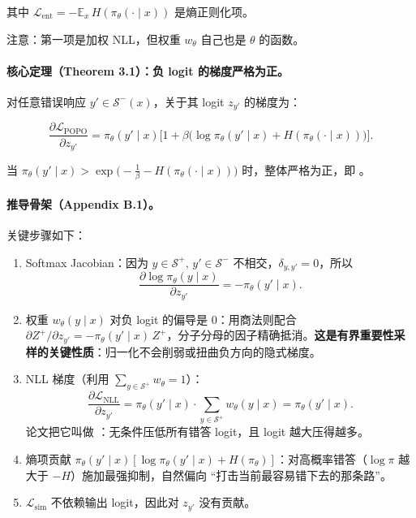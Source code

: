 其中 $\mathcal{L}_{\text{ent}}=-\mathbb{E}_x\,H(\pi_\theta(\cdot\mid x))$ 是熵正则化项。

注意：第一项是加权 NLL，但权重 $w_\theta$ 自己也是 $\theta$ 的函数。

\paragraph{核心定理（Theorem 3.1）：负 logit 的梯度严格为正。}
对任意错误响应 $y'\in\mathcal{S}^{-}(x)$，关于其 logit $z_{y'}$ 的梯度为：

\[
\frac{\partial \mathcal{L}_{\text{POPO}}}{\partial z_{y'}}
=
\pi_\theta(y'\mid x)\Big[1+\beta\big(\log\pi_\theta(y'\mid x)+H(\pi_\theta(\cdot\mid x))\big)\Big].
\]

当 $\pi_\theta(y'\mid x)>\exp\!\bigl(-\tfrac{1}{\beta}-H(\pi_\theta(\cdot\mid x))\bigr)$ 时，整体严格为正，即 。

\paragraph{推导骨架（Appendix B.1）。}
关键步骤如下：

\begin{enumerate}[leftmargin=1.5em]
  \item Softmax Jacobian：因为 $y\in\mathcal{S}^{+},\,y'\in\mathcal{S}^{-}$ 不相交，$\delta_{y,y'}=0$，所以
  \[
  \frac{\partial \log\pi_\theta(y\mid x)}{\partial z_{y'}}=-\pi_\theta(y'\mid x).
  \]
  \item 权重 $w_\theta(y\mid x)$ 对负 logit 的偏导是 0：用商法则配合 $\partial Z^{+}/\partial z_{y'}=-\pi_\theta(y'\mid x)\,Z^{+}$，分子分母的因子精确抵消。\textbf{这是有界重要性采样的关键性质}：归一化不会削弱或扭曲负方向的隐式梯度。
  \item NLL 梯度（利用 $\sum_{y\in\mathcal{S}^{+}}w_\theta=1$）：
  \[
  \frac{\partial \mathcal{L}_{\text{NLL}}}{\partial z_{y'}}
  =\pi_\theta(y'\mid x)\cdot\sum_{y\in\mathcal{S}^{+}}w_\theta(y\mid x)
  =\pi_\theta(y'\mid x).
  \]
  论文把它叫做 ：无条件压低所有错答 logit，且 logit 越大压得越多。
  \item 熵项贡献 $\pi_\theta(y'\mid x)[\log\pi_\theta(y'\mid x)+H(\pi_\theta)]$：对高概率错答（$\log\pi$ 越大于 $-H$）施加最强抑制，自然偏向 ``打击当前最容易错下去的那条路''。
  \item $\mathcal{L}_{\text{sim}}$ 不依赖输出 logit，因此对 $z_{y'}$ 没有贡献。
\end{enumerate}

